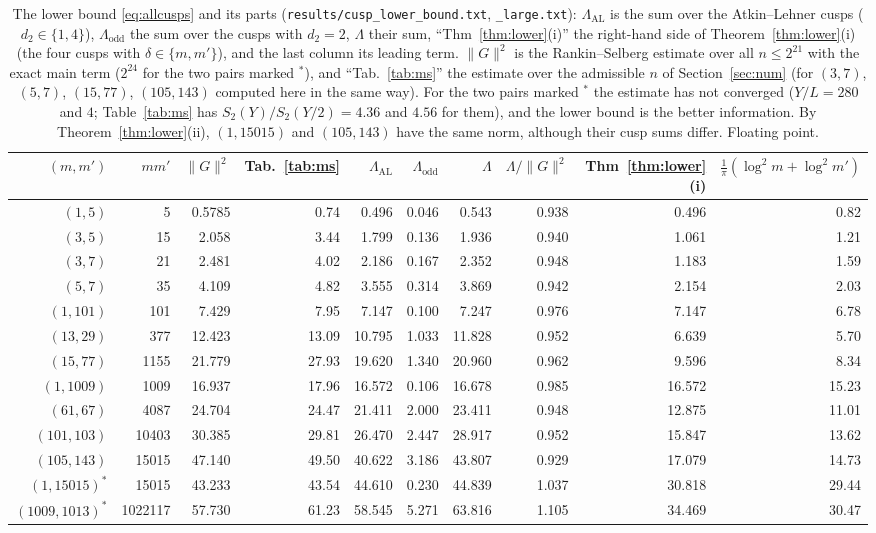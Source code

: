 ﻿\documentclass[11pt]{amsart}
\theoremstyle{remark}
\begin{document}
\begin{table}[H]
\centering
\footnotesize
\setlength{\tabcolsep}{4pt}
\begin{tabular}{rrrrrrrrrr}
\hline
$(m,m')$ & $mm'$ & $\|G\|^2$ & Tab.~\ref{tab:ms} & $\Lambda_{\mathrm{AL}}$ & $\Lambda_{\mathrm{odd}}$ & $\Lambda$ & $\Lambda/\|G\|^2$ & Thm~\ref{thm:lower}(i) & $\frac1\pi(\log^2m+\log^2m')$\\
\hline
$(1,5)$ & 5 & 0.5785 & 0.74 & 0.496 & 0.046 & 0.543 & 0.938 & 0.496 & 0.82\\
$(3,5)$ & 15 & 2.058 & 3.44 & 1.799 & 0.136 & 1.936 & 0.940 & 1.061 & 1.21\\
$(3,7)$ & 21 & 2.481 & 4.02 & 2.186 & 0.167 & 2.352 & 0.948 & 1.183 & 1.59\\
$(5,7)$ & 35 & 4.109 & 4.82 & 3.555 & 0.314 & 3.869 & 0.942 & 2.154 & 2.03\\
$(1,101)$ & 101 & 7.429 & 7.95 & 7.147 & 0.100 & 7.247 & 0.976 & 7.147 & 6.78\\
$(13,29)$ & 377 & 12.423 & 13.09 & 10.795 & 1.033 & 11.828 & 0.952 & 6.639 & 5.70\\
$(15,77)$ & 1155 & 21.779 & 27.93 & 19.620 & 1.340 & 20.960 & 0.962 & 9.596 & 8.34\\
$(1,1009)$ & 1009 & 16.937 & 17.96 & 16.572 & 0.106 & 16.678 & 0.985 & 16.572 & 15.23\\
$(61,67)$ & 4087 & 24.704 & 24.47 & 21.411 & 2.000 & 23.411 & 0.948 & 12.875 & 11.01\\
$(101,103)$ & 10403 & 30.385 & 29.81 & 26.470 & 2.447 & 28.917 & 0.952 & 15.847 & 13.62\\
$(105,143)$ & 15015 & 47.140 & 49.50 & 40.622 & 3.186 & 43.807 & 0.929 & 17.079 & 14.73\\
$(1,15015)^*$ & 15015 & 43.233 & 43.54 & 44.610 & 0.230 & 44.839 & 1.037 & 30.818 & 29.44\\
$(1009,1013)^*$ & 1022117 & 57.730 & 61.23 & 58.545 & 5.271 & 63.816 & 1.105 & 34.469 & 30.47\\
\hline
\end{tabular}
\medskip
\caption{The lower bound \eqref{eq:allcusps} and its parts (\texttt{results/cusp\_lower\_bound.txt}, \texttt{\_large.txt}): $\Lambda_{\mathrm{AL}}$ is the sum over the Atkin--Lehner cusps ($d_2\in\{1,4\}$), $\Lambda_{\mathrm{odd}}$ the sum over the cusps with $d_2=2$, $\Lambda$ their sum, ``Thm~\ref{thm:lower}(i)'' the right-hand side of Theorem~\ref{thm:lower}(i) (the four cusps with $\delta\in\{m,m'\}$), and the last column its leading term. $\|G\|^2$ is the Rankin--Selberg estimate over all $n\le2^{21}$ with the exact main term ($2^{24}$ for the two pairs marked $^*$), and ``Tab.~\ref{tab:ms}'' the estimate over the admissible $n$ of Section~\ref{sec:num} (for $(3,7)$, $(5,7)$, $(15,77)$, $(105,143)$ computed here in the same way). For the two pairs marked $^*$ the estimate has not converged ($Y/L=280$ and $4$; Table~\ref{tab:ms} has $S_2(Y)/S_2(Y/2)=4.36$ and $4.56$ for them), and the lower bound is the better information. By Theorem~\ref{thm:lower}(ii), $(1,15015)$ and $(105,143)$ have the same norm, although their cusp sums differ. Floating point.}
\label{tab:cusps}
\end{table}
\end{document}
